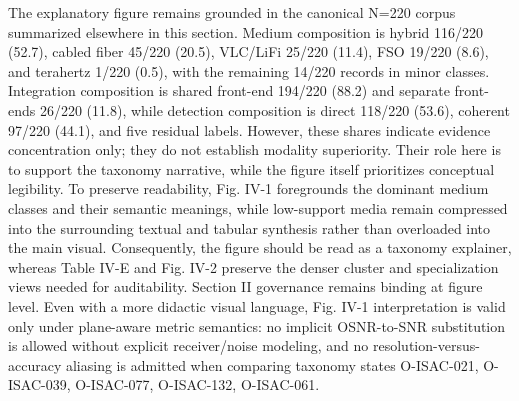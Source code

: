 {}The explanatory figure remains grounded in the canonical N=220 corpus summarized elsewhere in this section. Medium composition is hybrid 116/220 (52.7\markdownRendererPercentSign{}), cabled fiber 45/220 (20.5\markdownRendererPercentSign{}), VLC/LiFi 25/220 (11.4\markdownRendererPercentSign{}), FSO 19/220 (8.6\markdownRendererPercentSign{}), and terahertz 1/220 (0.5\markdownRendererPercentSign{}), with the remaining 14/220 records in minor classes. Integration composition is shared front-end 194/220 (88.2\markdownRendererPercentSign{}) and separate front-ends 26/220 (11.8\markdownRendererPercentSign{}), while detection composition is direct 118/220 (53.6\markdownRendererPercentSign{}), coherent 97/220 (44.1\markdownRendererPercentSign{}), and five residual labels. However, these shares indicate evidence concentration only; they do not establish modality superiority. Their role here is to support the taxonomy narrative, while the figure itself prioritizes conceptual legibility.\markdownRendererParagraphSeparator
{}To preserve readability, Fig. IV-1 foregrounds the dominant medium classes and their semantic meanings, while low-support media remain compressed into the surrounding textual and tabular synthesis rather than overloaded into the main visual. Consequently, the figure should be read as a taxonomy explainer, whereas Table IV-E and Fig. IV-2 preserve the denser cluster and specialization views needed for auditability.\markdownRendererParagraphSeparator
{}\markdownRendererParagraphSeparator
{}Section II governance remains binding at figure level. Even with a more didactic visual language, Fig. IV-1 interpretation is valid only under plane-aware metric semantics: no implicit OSNR-to-SNR substitution is allowed without explicit receiver/noise modeling, and no resolution-versus-accuracy aliasing is admitted when comparing taxonomy states O-ISAC-021, O-ISAC-039, O-ISAC-077, O-ISAC-132, O-ISAC-061.\markdownRendererInterblockSeparator

